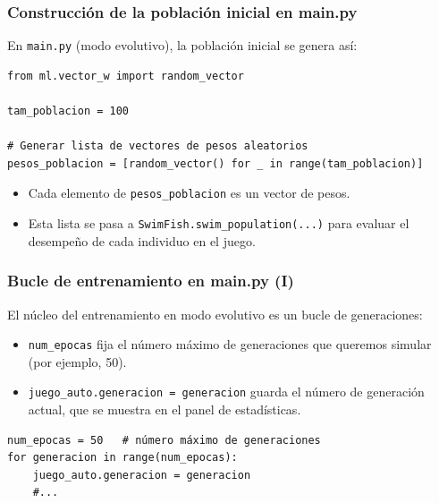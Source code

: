 \documentclass[
	11pt, %
]{beamer}
\begin{document}
\begin{frame}[fragile]
\frametitle{Construcción de la población inicial en main.py}

En \texttt{main.py} (modo evolutivo), la población inicial se genera así:

{\scriptsize
\begin{verbatim}
from ml.vector_w import random_vector

tam_poblacion = 100

# Generar lista de vectores de pesos aleatorios
pesos_poblacion = [random_vector() for _ in range(tam_poblacion)]
\end{verbatim}
}

\begin{itemize}
    \item Cada elemento de \texttt{pesos\_poblacion} es un vector de pesos.
    \item Esta lista se pasa a \texttt{SwimFish.swim\_population(...)}
          para evaluar el desempeño de cada individuo en el juego.
\end{itemize}

\end{frame}


\begin{frame}[fragile]
\frametitle{Bucle de entrenamiento en main.py (I)}

El núcleo del entrenamiento en modo evolutivo es un bucle de generaciones:

\begin{itemize}
    \item \texttt{num\_epocas} fija el número máximo de generaciones
          que queremos simular (por ejemplo, 50).
    \item \texttt{juego\_auto.generacion = generacion} guarda el número
          de generación actual, que se muestra en el panel de estadísticas.
\end{itemize}

{\scriptsize
\begin{verbatim}
num_epocas = 50   # número máximo de generaciones
for generacion in range(num_epocas):
    juego_auto.generacion = generacion
    #...
\end{verbatim}
}

\end{frame}

\end{document}
